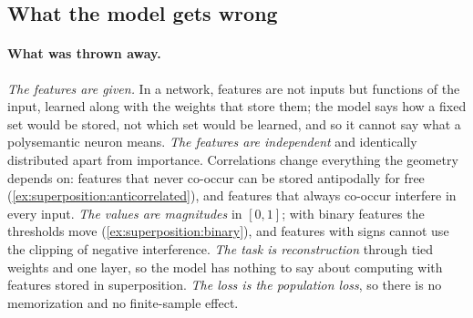 \begin{refsection}
\section{What the model gets wrong}\label{sec:superposition:wrong}

\paragraph{What was thrown away.} \emph{The features are given.} In a network, features are not inputs but functions of the input, learned along with the weights that store them; the model says how a fixed set would be stored, not which set would be learned, and so it cannot say what a polysemantic neuron means. \emph{The features are independent} and identically distributed apart from importance. Correlations change everything the geometry depends on: features that never co-occur can be stored antipodally for free (\cref{ex:superposition:anticorrelated}), and features that always co-occur interfere in every input. \emph{The values are magnitudes} in $[0,1]$; with binary features the thresholds move (\cref{ex:superposition:binary}), and features with signs cannot use the clipping of negative interference. \emph{The task is reconstruction} through tied weights and one layer, so the model has nothing to say about computing with features stored in superposition. \emph{The loss is the population loss}, so there is no memorization and no finite-sample effect.


\end{refsection}
